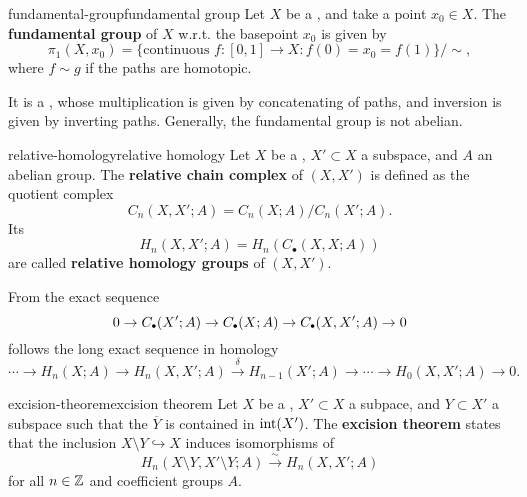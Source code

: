 \begin{topic}{fundamental-group}{fundamental group}
    Let $X$ be a , and take a point $x_0 \in X$. The \textbf{fundamental group} of $X$ w.r.t. the basepoint $x_0$ is given by
    \[ \pi_1(X, x_0) = \{ \text{continuous } f : [0, 1] \to X : f(0) = x_0 = f(1) \} / \sim{} , \]
    where $f \sim{} g$ if the paths are homotopic.
    
    It is a , whose multiplication is given by concatenating of paths, and inversion is given by inverting paths. Generally, the fundamental group is not abelian.
\end{topic}

\begin{topic}{relative-homology}{relative homology}
    Let $X$ be a , $X' \subset X$ a subspace, and $A$ an abelian group. The \textbf{relative chain complex} of $(X, X')$ is defined as the quotient complex
    \[ C_n(X, X'; A) = C_n(X; A) / C_n(X'; A) .  \]
    Its 
    \[ H_n(X, X'; A) = H_n(C_\bullet(X, X; A)) \]
    are called \textbf{relative homology groups} of $(X, X')$.
    
    From the exact sequence
    \[ 0 \to C_\bdot(X'; A) \to C_\bdot(X; A) \to C_\bdot(X, X'; A) \to 0 \]
    follows the long exact sequence in homology
    \[ \cdots \to H_n(X; A) \to H_n(X, X'; A) \xrightarrow{\delta} H_{n - 1}(X'; A) \to \cdots \to H_0(X, X'; A) \to 0 . \]
\end{topic}

\begin{topic}{excision-theorem}{excision theorem}
    Let $X$ be a , $X' \subset X$ a subpace, and $Y \subset X'$ a subspace such that the  $\overline{Y}$ is contained in  $\textup{int}(X')$. The \textbf{excision theorem} states that the inclusion $X \setminus Y \hookrightarrow X$ induces isomorphisms of 
    \[ H_n(X \setminus Y, X' \setminus Y; A) \xrightarrow{\sim} H_n(X, X'; A) \]
    for all $n \in \mathbb{Z}$ and coefficient groups $A$.
\end{topic}

